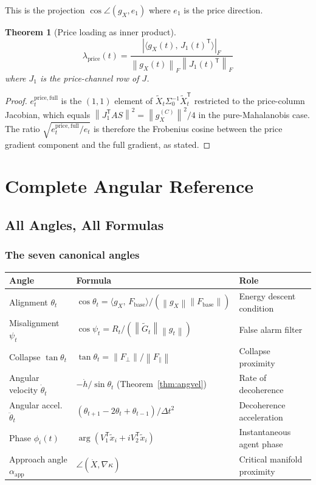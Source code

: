 \documentclass[11pt,a4paper,openany]{book}
\newtheorem{theorem}{Theorem}[chapter]
\theoremstyle{definition}
\newcommand{\T}{^{\mathsf{T}}}
\newcommand{\norm}[1]{\left\|#1\right\|}
\newcommand{\inner}[2]{\langle #1,\,#2\rangle}
\newcommand{\Fbase}{F_{\mathrm{base}}}
\newcommand{\gX}{g_X}
\begin{document}
This is the projection $\cos\angle(\gX, e_1)$ where $e_1$ is the price direction.

\begin{theorem}[Price loading as inner product]
\[
\lambda_\mathrm{price}(t) = \frac{|\inner{\gX(t)}{J_1(t)\T}|_F}{\norm{\gX(t)}_F\norm{J_1(t)\T}_F}
\]
where $J_1$ is the price-channel row of $J$.
\end{theorem}

\begin{proof}
$e_t^\mathrm{price,full}$ is the $(1,1)$ element of $\tilde X_t\Sigma_0^{-1}\tilde X_t\T$ restricted to the price-column Jacobian, which equals $\norm{J_1\T AS}^2 = \norm{\gX^{(C)}}^2/4$ in the pure-Mahalanobis case.
The ratio $\sqrt{e_t^\mathrm{price,full}/e_t}$ is therefore the Frobenius cosine between the price gradient component and the full gradient, as stated.
\end{proof}

\part{Complete Angular Reference}

\chapter{All Angles, All Formulas}

\section{The seven canonical angles}

\begin{resultbox}
\renewcommand{\arraystretch}{1.5}
\begin{tabular}{p{2.5cm}p{5.5cm}p{5cm}}
\toprule
\textbf{Angle} & \textbf{Formula} & \textbf{Role} \\
\midrule
Alignment $\theta_t$ & $\cos\theta_t = \inner{\gX}{\Fbase}/(\norm{\gX}\norm{\Fbase})$ & Energy descent condition \\
Misalignment $\psi_t$ & $\cos\psi_t = R_t/(\norm{\tilde G_t}\norm{g_t})$ & False alarm filter \\
Collapse $\tan\theta_t$ & $\tan\theta_t = \norm{F_\perp}/\norm{F_\parallel}$ & Collapse proximity \\
Angular velocity $\dot\theta_t$ & $-\dot h/\sin\theta_t$ (Theorem~\ref{thm:angvel}) & Rate of decoherence \\
Angular accel. $\ddot\theta_t$ & $(\theta_{t+1}-2\theta_t+\theta_{t-1})/\Delta t^2$ & Decoherence acceleration \\
Phase $\phi_i(t)$ & $\arg(V_1\T\tilde x_i + iV_2\T\tilde x_i)$ & Instantaneous agent phase \\
Approach angle $\alpha_\mathrm{app}$ & $\angle(\dot X, \nabla\kappa)$ & Critical manifold proximity \\
\bottomrule
\end{tabular}
\end{resultbox}
\end{document}
